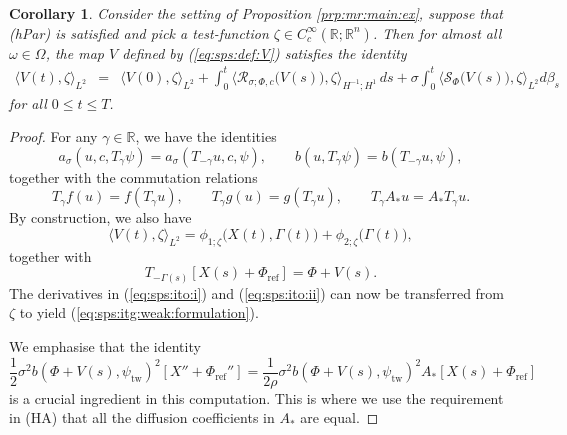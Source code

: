 \documentclass[10pt]{articleHJ}
\newcommand{\Real}{\mathbb{R}}							%
\newcommand{\sref}[1]{(\ref{#1})}                       %
\newtheorem{cor}[thm]{Corollary}
\numberwithin{equation}{section}
\begin{document}
\begin{cor}
\label{cor:sps:weak:form:with:zeta}
Consider the setting
of Proposition
\ref{prp:mr:main:ex},
suppose that (hPar) is satisfied
and pick a test-function $\zeta \in C^\infty_c(\Real ;\Real^n)$.
Then for almost all $\omega \in \Omega$,
the map $V$
defined by \sref{eq:sps:def:V}
satisfies
the identity
\begin{equation}
\label{eq:sps:itg:weak:formulation}
  \begin{array}{lcl}
  \langle V(t) , \zeta \rangle_{L^2}
   & = & \langle V(0) , \zeta \rangle_{L^2}
    + \int_0^t
     \langle \mathcal{R}_{\sigma;\Phi, c}\big( V(s) \big)  , \zeta \rangle_{H^{-1}; H^1}   \, ds
    + \sigma \int_0^t
        \langle \mathcal{S}_{\Phi}\big(V(s)\big) , \zeta \rangle_{L^2}
       d \beta_s
  \end{array}
  \end{equation}
for all $0 \le t \le T$.
\end{cor}
\begin{proof}
For any $\gamma \in \Real$,
we have the identities
\begin{equation}
a_{\sigma}( u, c, T_{\gamma} \psi )
=a_{\sigma} (T_{-\gamma} u , c, \psi ),
\qquad
b( u,  T_{\gamma} \psi )
= b(T_{-\gamma} u , \psi ),
\end{equation}
together with the commutation relations
\begin{equation}
T_{\gamma} f(u) = f (T_{\gamma} u),
\qquad
T_{\gamma} g(u) = g (T_{\gamma} u),
\qquad
T_{\gamma} A_* u = A_* T_{\gamma} u.
\end{equation}
By construction, we also have
\begin{equation}
\langle V(t), \zeta \rangle_{L^2}
 = \phi_{1;\zeta}\big(X(t), \Gamma(t) \big)
   + \phi_{2; \zeta}\big( \Gamma(t) \big) ,
\end{equation}
together with
\begin{equation}
T_{-\Gamma(s)} [X(s) + \Phi_{\mathrm{ref}}] = \Phi + V(s).
\end{equation}
The derivatives in \sref{eq:sps:ito:i}
and \sref{eq:sps:ito:ii} can now be
transferred from $\zeta$
to yield \sref{eq:sps:itg:weak:formulation}.

We emphasise that the identity
\begin{equation}
\frac{1}{2} \sigma^2 b(\Phi + V(s)  , \psi_{\mathrm{tw}})^2
[X'' + \Phi_{\mathrm{ref}}'']
= \frac{1}{2\rho} \sigma^2 b(\Phi + V(s)  , \psi_{\mathrm{tw}})^2 A_*
  [X(s) + \Phi_{\mathrm{ref}} ]
\end{equation}
is a crucial ingredient in this computation.
This is where we use the requirement in (HA) that all
the diffusion coefficients in $A_*$ are equal.
\end{proof}
\end{document}

